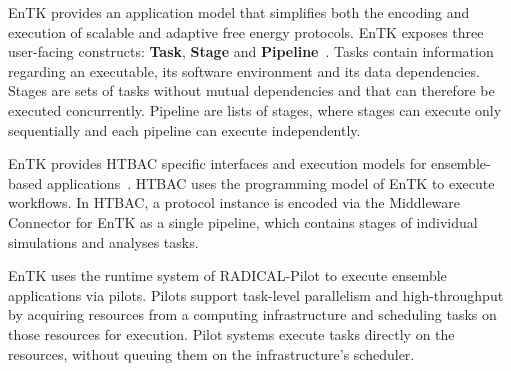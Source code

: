 EnTK provides an application model that simplifies both the encoding and
execution of scalable and adaptive free energy protocols. EnTK exposes three
user-facing constructs: \textbf{Task}, \textbf{Stage} and
\textbf{Pipeline}~\cite{power-of-many17}. Tasks contain information regarding
an executable, its software environment and its data dependencies. Stages are
sets of tasks without mutual dependencies and that can therefore be executed
concurrently. Pipeline are lists of stages, where stages can execute only
sequentially and each pipeline can execute independently.

EnTK provides HTBAC specific interfaces and execution models for
ensemble-based applications~\cite{power-of-many17}. HTBAC uses the
programming model of EnTK to execute workflows. In HTBAC, a protocol instance
is encoded via the Middleware Connector for EnTK as a single pipeline, which
contains stages of individual simulations and analyses tasks.

EnTK uses the runtime system of RADICAL-Pilot to execute ensemble
applications via pilots. Pilots support task-level parallelism and
high-throughput by acquiring resources from a computing infrastructure and
scheduling tasks on those resources for execution. Pilot systems execute
tasks directly on the resources, without queuing them on the infrastructure's
scheduler.







